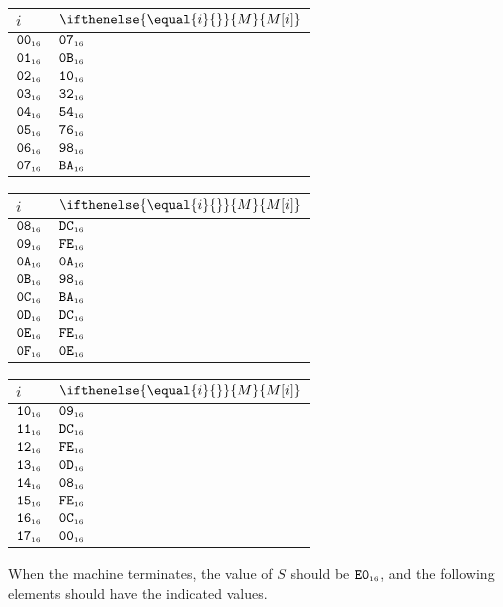 \documentclass[a4paper,12pt]{article}
\makeatletter
\newcommand{\num}[1]{\texttt{#1}}
\newcommand{\hex}[1]{\num{#1}_{\textup{\tiny 16}}}
\newcommand{\MEM}[1]{\ifthenelse{\equal{#1}{}}{M}{M[#1]}}
\newcommand{\SP}{S}
\newenvironment{memtable}{%
  \begin{trivlist}
    \item
    }{%
    \end{trivlist}}
\newenvironment{memcolumn}{%
  \begin{tabular}{@{}ll@{}}
    $i$ & $\MEM{i}$ \\
    \hline}
    {%
    \hline
  \end{tabular}}
\newcommand{\memspace}{\qquad}
\makeatother
\begin{document}
\begin{memtable}
  \begin{memcolumn}
    $\hex{00}$ & $\hex{07}$ \\
    $\hex{01}$ & $\hex{0B}$ \\
    $\hex{02}$ & $\hex{10}$ \\
    $\hex{03}$ & $\hex{32}$ \\
    $\hex{04}$ & $\hex{54}$ \\
    $\hex{05}$ & $\hex{76}$ \\
    $\hex{06}$ & $\hex{98}$ \\
    $\hex{07}$ & $\hex{BA}$ \\
  \end{memcolumn}
  \memspace
  \begin{memcolumn}
    $\hex{08}$ & $\hex{DC}$ \\
    $\hex{09}$ & $\hex{FE}$ \\
    $\hex{0A}$ & $\hex{0A}$ \\
    $\hex{0B}$ & $\hex{98}$ \\
    $\hex{0C}$ & $\hex{BA}$ \\
    $\hex{0D}$ & $\hex{DC}$ \\
    $\hex{0E}$ & $\hex{FE}$ \\
    $\hex{0F}$ & $\hex{0E}$ \\
  \end{memcolumn}
  \memspace
  \begin{memcolumn}
    $\hex{10}$ & $\hex{09}$ \\
    $\hex{11}$ & $\hex{DC}$ \\
    $\hex{12}$ & $\hex{FE}$ \\
    $\hex{13}$ & $\hex{0D}$ \\
    $\hex{14}$ & $\hex{08}$ \\
    $\hex{15}$ & $\hex{FE}$ \\
    $\hex{16}$ & $\hex{0C}$ \\
    $\hex{17}$ & $\hex{00}$ \\
  \end{memcolumn}
\end{memtable}
When the machine terminates, the value of $\SP$ should be $\hex{E0}$, and the following elements should have the indicated values.
\end{document}
